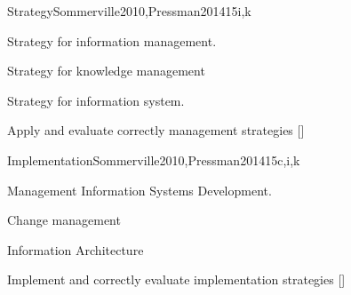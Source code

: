 \begin{syllabus}
\begin{unit}{Strategy}{}{Sommerville2010,Pressman2014}{15}{i,k}
\begin{topics}
    \item Strategy for information management.
    \item Strategy for knowledge management
    \item Strategy for information system.
\end{topics}
\begin{learningoutcomes}
    \item Apply and evaluate correctly management strategies [\Assessment]
\end{learningoutcomes}
\end{unit}

\begin{unit}{Implementation}{}{Sommerville2010,Pressman2014}{15}{c,i,k}
\begin{topics}
    \item Management Information Systems Development.
    \item Change management
    \item Information Architecture
\end{topics}
\begin{learningoutcomes}
    \item Implement and correctly evaluate implementation strategies [\Assessment]
\end{learningoutcomes}
\end{unit}

\begin{coursebibliography}
\end{coursebibliography}

\end{syllabus}
